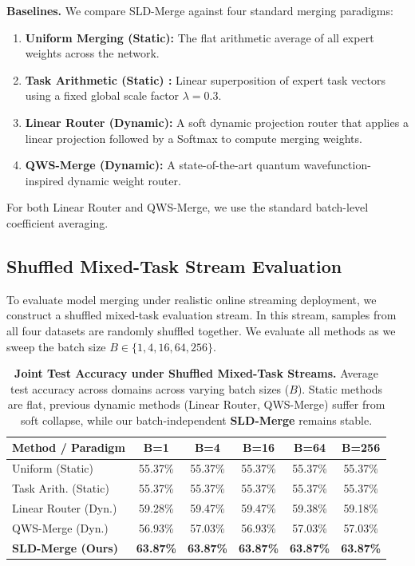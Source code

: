 \textbf{Baselines.}
We compare SLD-Merge against four standard merging paradigms:
\begin{enumerate}
    \item \textbf{Uniform Merging (Static):} The flat arithmetic average of all expert weights across the network.
    \item \textbf{Task Arithmetic (Static) \cite{ilharco2022editing}:} Linear superposition of expert task vectors using a fixed global scale factor $\lambda = 0.3$.
    \item \textbf{Linear Router (Dynamic):} A soft dynamic projection router that applies a linear projection followed by a Softmax to compute merging weights.
    \item \textbf{QWS-Merge (Dynamic):} A state-of-the-art quantum wavefunction-inspired dynamic weight router.
\end{enumerate}
For both Linear Router and QWS-Merge, we use the standard batch-level coefficient averaging.

\subsection{Shuffled Mixed-Task Stream Evaluation}
To evaluate model merging under realistic online streaming deployment, we construct a shuffled mixed-task evaluation stream. In this stream, samples from all four datasets are randomly shuffled together. We evaluate all methods as we sweep the batch size $B \in \{1, 4, 16, 64, 256\}$. 

\begin{table}[t]
\caption{\textbf{Joint Test Accuracy under Shuffled Mixed-Task Streams.} Average test accuracy across domains across varying batch sizes ($B$). Static methods are flat, previous dynamic methods (Linear Router, QWS-Merge) suffer from soft collapse, while our batch-independent \textbf{SLD-Merge} remains stable.}
\label{tab:mixed_stream_accuracy}
\vskip 0.15in
\begin{center}
\begin{small}
\begin{sc}
\setlength{\tabcolsep}{3pt}
\begin{tabular}{lccccc}
\toprule
Method / Paradigm & B=1 & B=4 & B=16 & B=64 & B=256 \\
\midrule
Uniform (Static)   & 55.37\% & 55.37\% & 55.37\% & 55.37\% & 55.37\% \\
Task Arith. (Static)   & 55.37\% & 55.37\% & 55.37\% & 55.37\% & 55.37\% \\
Linear Router (Dyn.)    & 59.28\% & 59.47\% & 59.47\% & 59.38\% & 59.18\% \\
QWS-Merge (Dyn.)        & 56.93\% & 57.03\% & 56.93\% & 57.03\% & 57.03\% \\
\textbf{SLD-Merge (Ours)} & \textbf{63.87\%} & \textbf{63.87\%} & \textbf{63.87\%} & \textbf{63.87\%} & \textbf{63.87\%} \\
\bottomrule
\end{tabular}
\end{sc}
\end{small}
\end{center}
\vskip -0.1in
\end{table}

